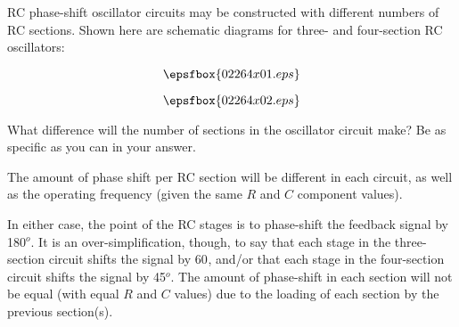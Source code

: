 

RC phase-shift oscillator circuits may be constructed with different numbers of RC sections.  Shown here are schematic diagrams for three- and four-section RC oscillators:

$$\epsfbox{02264x01.eps}$$

$$\epsfbox{02264x02.eps}$$

What difference will the number of sections in the oscillator circuit make?  Be as specific as you can in your answer.







The amount of phase shift per RC section will be different in each circuit, as well as the operating frequency (given the same $R$ and $C$ component values).







In either case, the point of the RC stages is to phase-shift the feedback signal by 180$^{o}$.  It is an over-simplification, though, to say that each stage in the three-section circuit shifts the signal by 60$^{}$, and/or that each stage in the four-section circuit shifts the signal by 45$^{o}$.  The amount of phase-shift in each section will not be equal (with equal $R$ and $C$ values) due to the loading of each section by the previous section(s).





